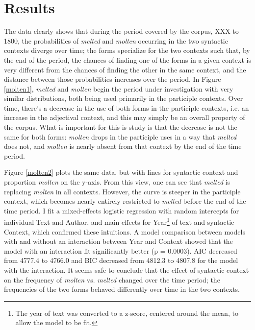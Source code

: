 \documentclass{artikel3}
\begin{document}
\section{Results}
\label{results}

The data clearly shows that during the period covered by the corpus, XXX to 1800, the probabilities of \textsl{melted} and \textsl{molten} occurring in the two syntactic contexts diverge over time; the forms specialize for the two contexts such that, by the end of the period, the chances of finding one of the forms in a given context is very different from the chances of finding the other in the same context, and the distance between those probabilities increases over the period. In Figure \ref{molten1}, \textsl{melted} and \textsl{molten} begin the period under investigation with very similar distributions, both being used primarily in the participle contexts. Over time, there's a decrease in the use of both forms in the participle contexts, i.e. an increase in the adjectival context, and this may simply be an overall property of the corpus. What is important for this is study is that the decrease is not the same for both forms: \textsl{molten} drops in the participle uses in a way that \textsl{melted} does not, and \textsl{molten} is nearly absent from that context by the end of the time period.

Figure \ref{molten2} plots the same data, but with lines for syntactic context and proportion \textsl{molten} on the y-axis. From this view, one can see that \textsl{melted} is replacing \textsl{molten} in all contexts. However, the curve is steeper in the participle context, which becomes nearly entirely restricted to \textsl{melted} before the end of the time period. I fit a mixed-effects logistic regression with random intercepts for individual Text and Author, and main effects for Year\footnote{The year of text was converted to a z-score, centered around the mean, to allow the model to be fit.} of text and syntactic Context, which confirmed these intuitions. A model comparison between models with and without an interaction between Year and Context showed that the model with an interaction fit significantly better (p = 0.0003). AIC decreased from 4777.4 to 4766.0 and BIC decreased from 4812.3 to 4807.8 for the model with the interaction. It seems safe to conclude that the effect of syntactic context on the frequency of \textsl{molten} vs. \textsl{melted} changed over the time period; the frequencies of the two forms behaved differently over time in the two contexts.
\end{document}
